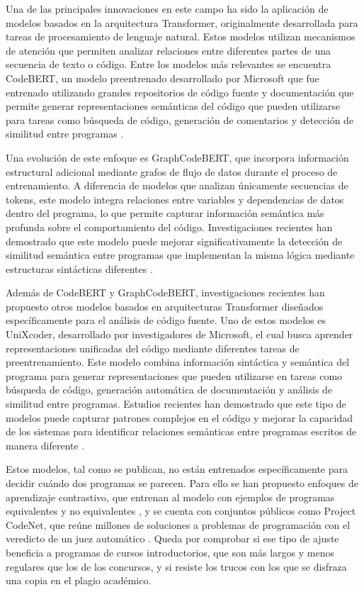 Una de las principales innovaciones en este campo ha sido la aplicación de modelos basados en la arquitectura Transformer, originalmente desarrollada para tareas de procesamiento de lenguaje natural. Estos modelos utilizan mecanismos de atención que permiten analizar relaciones entre diferentes partes de una secuencia de texto o código. Entre los modelos más relevantes se encuentra CodeBERT, un modelo preentrenado desarrollado por Microsoft que fue entrenado utilizando grandes repositorios de código fuente y documentación que permite generar representaciones semánticas del código que pueden utilizarse para tareas como búsqueda de código, generación de comentarios y detección de similitud entre programas \cite{Feng2020CodeBERT}.

Una evolución de este enfoque es GraphCodeBERT, que incorpora información estructural adicional mediante grafos de flujo de datos durante el proceso de entrenamiento. A diferencia de modelos que analizan únicamente secuencias de tokens, este modelo integra relaciones entre variables y dependencias de datos dentro del programa, lo que permite capturar información semántica más profunda sobre el comportamiento del código. Investigaciones recientes han demostrado que este modelo puede mejorar significativamente la detección de similitud semántica entre programas que implementan la misma lógica mediante estructuras sintácticas diferentes \cite{Guo2021GraphCodeBERT}.

Además de CodeBERT y GraphCodeBERT, investigaciones recientes han propuesto otros modelos basados en arquitecturas Transformer diseñados específicamente para el análisis de código fuente. Uno de estos modelos es UniXcoder, desarrollado por investigadores de Microsoft, el cual busca aprender representaciones unificadas del código mediante diferentes tareas de preentrenamiento. Este modelo combina información sintáctica y semántica del programa para generar representaciones que pueden utilizarse en tareas como búsqueda de código, generación automática de documentación y análisis de similitud entre programas. Estudios recientes han demostrado que este tipo de modelos puede capturar patrones complejos en el código y mejorar la capacidad de los sistemas para identificar relaciones semánticas entre programas escritos de manera diferente \cite{Guo2022UniXcoder}.

Estos modelos, tal como se publican, no están entrenados específicamente para decidir cuándo dos programas se parecen. Para ello se han propuesto enfoques de aprendizaje contrastivo, que entrenan al modelo con ejemplos de programas equivalentes y no equivalentes \cite{Jain2021ContraCode}, y se cuenta con conjuntos públicos como Project CodeNet, que reúne millones de soluciones a problemas de programación con el veredicto de un juez automático \cite{Puri2021CodeNet}. Queda por comprobar si ese tipo de ajuste beneficia a programas de cursos introductorios, que son más largos y menos regulares que los de los concursos, y si resiste los trucos con los que se disfraza una copia en el plagio académico.

